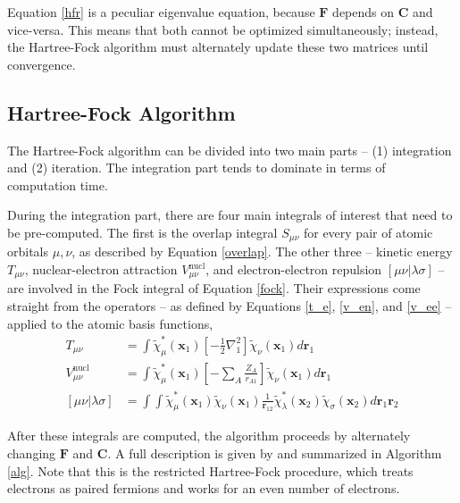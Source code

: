 \documentclass[12pt]{article}
\newcommand{\vect}[1]{\boldsymbol{#1}}
\begin{document}
Equation \ref{hfr} is a peculiar eigenvalue equation, because $\vect{F}$ depends on $\vect{C}$ and vice-versa.  This means that both cannot be optimized simultaneously; instead, the Hartree-Fock algorithm must alternately update these two matrices until convergence.  

\subsection{Hartree-Fock Algorithm}

The Hartree-Fock algorithm \cite{szabo2012} can be divided into two main parts -- (1) integration and (2) iteration.  The integration part tends to dominate in terms of computation time.  

During the integration part, there are four main integrals of interest that need to be pre-computed.  The first is the overlap integral $S_{\mu \nu}$ for every pair of atomic orbitals $\mu, \nu$, as described by Equation \ref{overlap}.  The other three -- kinetic energy $T_{\mu \nu}$, nuclear-electron attraction $V_{\mu \nu}^\text{nucl}$, and electron-electron repulsion $[\mu \nu | \lambda \sigma]$ -- are involved in the Fock integral of Equation \ref{fock}.  Their expressions come straight from the operators -- as defined by Equations \ref{t_e}, \ref{v_en}, and \ref{v_ee} -- applied to the atomic basis functions,
\begin{align}
T_{\mu \nu} &= \int \tilde{\chi}^*_\mu(\vect{x}_1) \left[-\frac{1}{2} \nabla_1^2\right] \tilde{\chi}_\nu (\vect{x}_1) d \vect{r}_1  \\
V_{\mu \nu}^\text{nucl} &= \int \tilde{\chi}^*_\mu(\vect{x}_1) \left[ - \sum_{A} \frac{Z_A}{r_{A1}} \right] \tilde{\chi}_\nu(\vect{x}_1) d\vect{r}_1 \\
[\mu \nu | \lambda \sigma]  &= \int \int \tilde{\chi}^*_\mu(\vect{x}_1) \tilde{\chi}_\nu(\vect{x}_1)  \frac{1}{\vect{r}_{12}} \tilde{\chi}^*_\lambda(\vect{x}_2) \tilde{\chi}_\sigma(\vect{x}_2) d \vect{r}_1 \vect{r}_2
\end{align}

After these integrals are computed, the algorithm proceeds by alternately changing $\vect{F}$ and $\vect{C}$.  A full description is given by \cite{szabo2012} and summarized in Algorithm \ref{alg}.  Note that this is the restricted Hartree-Fock procedure, which treats electrons as paired fermions and works for an even number of electrons.  
\end{document}
